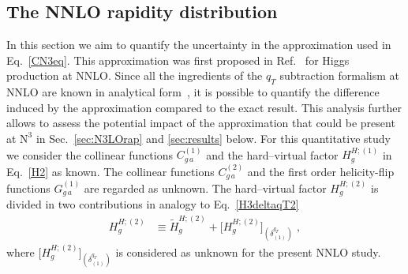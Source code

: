 \documentclass[12pt]{article}
\DeclareRobustCommand{\qt}{\ensuremath{q_T}\xspace}
\DeclareRobustCommand{\LO}{\text{LO}\xspace}
\DeclareRobustCommand{\N}[1]{\ensuremath{\text{N}^{#1}}} %
\begin{document}
\subsection{The NNLO rapidity distribution}
\label{sec:NNLOrap}

In this section we aim to quantify the uncertainty in the approximation used in Eq.~\eqref{CN3eq}. This approximation was first proposed in Ref.~\cite{Bozzi:2005wk} for Higgs production at NNLO. Since all the ingredients of the $\qt$ subtraction formalism at NNLO are known in analytical form~\cite{Catani:2011kr}, it is possible to quantify the difference induced by the approximation compared to the exact result. This analysis further allows to assess the potential impact of the approximation that could be present at \N3\LO in Sec.~\ref{sec:N3LOrap} and \ref{sec:results} below. For this quantitative study we consider the collinear functions $C^{(1)}_{g\,a}$ and the hard--virtual factor $H^{H;(1)}_g$ in Eq.~\eqref{H2} as known. The collinear functions $C^{(2)}_{g\,a}$ and the first order helicity-flip functions $G^{(1)}_{g\,a}$ are regarded as unknown. The hard--virtual factor $H^{H;(2)}_g$ is divided in two contributions in analogy to Eq.~\eqref{H3deltaqT2}
\begin{align}
  H^{H;(2)}_g  
  &\equiv  
  \widetilde{H}^{H;(2)}_{g} + \big[H^{H;(2)}_{g}\big]_{(\delta^{\qt}_{(1)})} \;,
\end{align}
where $\big[H^{H;(2)}_{g}\big]_{(\delta^{\qt}_{(1)})}$ is considered as unknown for the present NNLO study. 
\end{document}
